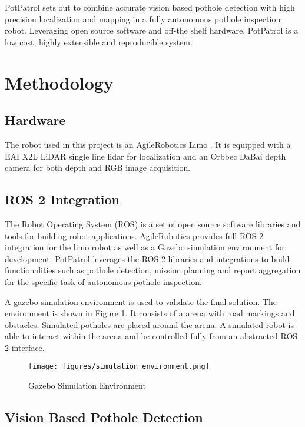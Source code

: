 \documentclass[conference]{IEEEtran}
\begin{document}
PotPatrol sets out to combine accurate vision based pothole detection with high precision localization and mapping in a fully autonomous pothole inspection robot. Leveraging open source software and off-the shelf hardware, PotPatrol is a low cost, highly extensible and reproducible system.

\section{Methodology}

\subsection{Hardware}

The robot used in this project is an AgileRobotics Limo \cite{AgilexAi}. It is equipped with a EAI X2L LiDAR single line lidar \cite{YDLIDARX2_YDLIDARFocus} for localization and an Orbbec DaBai \cite{HomeORBBEC3D} depth camera for both depth and RGB image acquisition.

\subsection{ROS 2 Integration}

The Robot Operating System (ROS) is a set of open source software libraries and tools for building robot applications. AgileRobotics provides full ROS 2 integration for the limo robot as well as a Gazebo simulation environment for development. PotPatrol leverages the ROS 2 libraries and integrations to build functionalities such as pothole detection, mission planning and report aggregation for the specific task of autonomous pothole inspection.

A gazebo simulation environment is used to validate the final solution. The environment is shown in Figure \ref{fig:gazebo}. It consists of a arena with road markings and obstacles. Simulated potholes are placed around the arena. A simulated robot is able to interact within the arena and be controlled fully from an abstracted ROS 2 interface.

\begin{figure}[h]
    \centering
    \texttt{[image: figures/simulation\_environment.png]}
    \caption{Gazebo Simulation Environment}
    \label{fig:gazebo}
\end{figure}

\subsection{Vision Based Pothole Detection}
\end{document}
